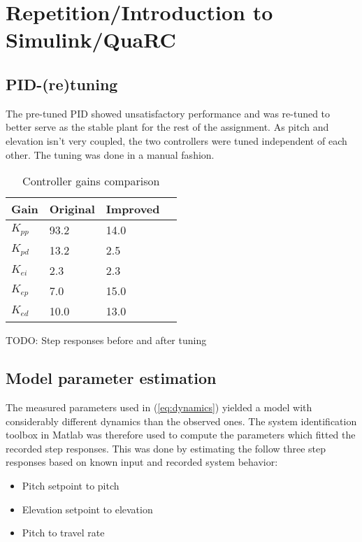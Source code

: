 \section{Repetition/Introduction to Simulink/QuaRC}\label{sec:prob1}
\label{text:problem1}

\subsection{PID-(re)tuning}
The pre-tuned PID showed unsatisfactory performance and was re-tuned to better serve as the stable plant for the rest of the assignment. As pitch and elevation isn't very coupled, the two controllers were tuned independent of each other. The tuning was done in a manual fashion.

\begin{table}[hp]
	\centering
	\caption{Controller gains comparison}
	\begin{tabular}{llll}
		\hline
		Gain & Original & Improved \\
		\hline
		$K_{pp}$ & 93.2 & 14.0 \\
		$K_{pd}$ & 13.2 & 2.5 \\
		$K_{ei}$ & 2.3 & 2.3 \\
		$K_{ep}$ & 7.0 & 15.0 \\
		$K_{ed}$ & 10.0 & 13.0 \\
	\end{tabular}
	\label{tab:gains}
\end{table}

TODO: Step responses before and after tuning


\subsection{Model parameter estimation}
The measured parameters used in (\ref{eq:dynamics}) yielded a model with considerably different dynamics than the observed ones. The system identification toolbox in Matlab was therefore used to compute the parameters which fitted the recorded step responses. This was done by estimating the follow three step responses based on known input and recorded system behavior:

\begin{itemize}
	\item{Pitch setpoint to pitch}
	\item{Elevation setpoint to elevation}
	\item{Pitch to travel rate}
\end{itemize}

